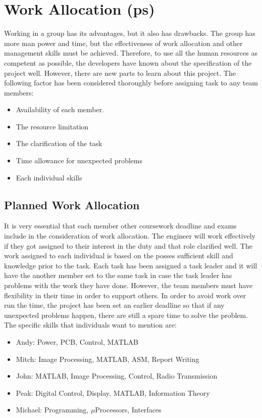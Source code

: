 \section{Work Allocation (ps)}

Working in a group has its advantages, but it also has drawbacks. The group has more man power and time, but the effectiveness of work allocation and other management skills must be achieved. Therefore, to use all the human resources as competent as possible, the developers have known about the specification of the project well. However, there are new parts to learn about this project. The following factor has been considered thoroughly before assigning task to any team members:

\begin{itemize}
\item	Availability of each member.

\item	The resource limitation
 
\item	The clarification of the task

\item   Time allowance for unexpected problems

\item	Each individual skills
\end{itemize}


\subsection*{Planned Work Allocation}
\label{sec:work_plan}
It is very essential that each member other coursework deadline and exams include in the consideration of work allocation. 
The engineer will work effectively if they got assigned  to their interest in the duty and that role clarified well. 
The work assigned to each individual is based on the posses sufficient skill and knowledge prior to the task. 
Each task has been assigned a task leader and it will have the another member set to the same task in case the task leader has problems with the work they have done.
However, the team members must have flexibility in their time in order to support others. 
In order to avoid work over run the time, the project has been set an earlier deadline so that if any unexpected problems happen, there are still a spare time to solve the problem. The specific skills that individuals want to mention are:

\begin{itemize}
\item Andy: Power, PCB, Control, MATLAB
\item Mitch: Image Processing, MATLAB, ASM, Report Writing
\item John: MATLAB, Image Processing, Control, Radio Transmission
\item Peak: Digital Control, Display, MATLAB, Information Theory
\item Michael: Programming, $\mu$Processors, Interfaces
\end{itemize}

